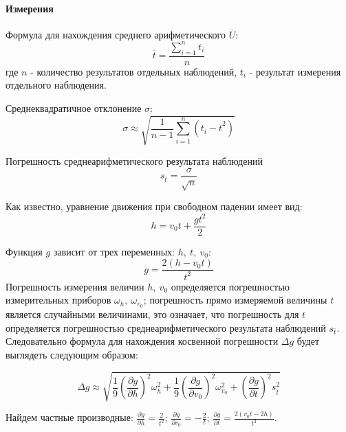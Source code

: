 \paragraph{Измерения}

Формула для нахождения среднего арифметического $\overline{U}$:
\begin{equation}
  \overline{t} = \frac{\sum_{i=1}^{n} t_i}{n}
\end{equation}
где $n$ - количество результатов отдельных наблюдений, $t_i$ - результат измерения отдельного наблюдения.

Среднеквадратичное отклонение $\sigma$:
\begin{equation}
   \sigma \approx \sqrt{\frac{1}{n-1} \sum_{i = 1}^{n} (t_i -\overline{t}^2)}
\end{equation}

Погрешность среднеарифметического результата наблюдений
\begin{equation}
   s_{\overline{t}}=\frac{\sigma}{\sqrt{n}}
\end{equation}

Как известно, уравнение движения при свободном падении имеет вид:
\begin{equation}
  h = v_0 t + \frac{gt^2}{2}
\end{equation}

Функция $g$ зависит от трех переменных: $h, \ t, \ v_0$:
\begin{equation}
  g = \frac{2(h - v_0 t)}{t^2}
\end{equation}
Погрешность измерения величин $h, \  v_0$ определяется погрешностью измерительных приборов $\omega_{h}, \ \omega_{v_0}$; погрешность прямо измеряемой величины $t$  является случайными величинами, это означает, что погрешность для $t$ определяется погрешностью среднеарифметического результата наблюдений  $s_{\overline{t}}$. Следовательно формула для нахождения косвенной погрешности $\Delta g$ будет выглядеть следующим образом:

\begin{equation}
  \Delta g \approx \sqrt{\frac{1}{9} \left( \frac{\partial g}{\partial h} \right)^2 \omega_h^2 +\frac{1}{9} \left( \frac{\partial g}{\partial v_0} \right)^2 \omega_{v_0}^2 + \left( \frac{\partial g}{\partial t} \right)^2 s_{\overline{t}}^2}
\end{equation}

Найдем частные производные: $\frac{\partial g}{\partial h} = \frac{2}{t^2}$;
$\frac{\partial g}{\partial v_0} = -\frac{2}{t}$;
$\frac{\partial g}{\partial t} = \frac{2(v_0 t - 2h)}{t^3}$.


